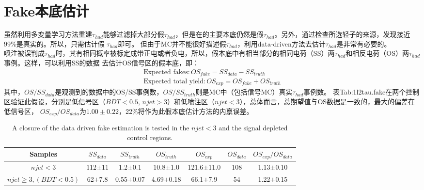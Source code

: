 \section{Fake本底估计}
虽然利用多变量学习方法重建$\tau_{had}$能够过滤掉大部分假$\tau_{had}$，但是在\ltwotau 的主要本底仍然是假$\tau_{had}$。另外，通过检查所选轻子的来源，发现接近99\%是真实的。所以，只需估计假
$\tau_{had}$即可。
但由于MC并不能很好描述假$\tau_{had}$，利用data-driven方法去估计$\tau_{had}$是非常有必要的。\\
喷注被误判成$\tau_{had}$时，其有相同概率被标定成带正电或者负电，所以，假本底中有相当部分的相同电荷（SS）两$\tau_{had}$和相反电荷（OS）两$\tau_{had}$事例。这样，可以利用SS的数据
去估计OS信号区的假本底，即：
\begin{equation}
\begin{aligned}
\text{Expected fakes}: OS_{fake}=SS_{data}-SS_{truth} \\
\text{Expected total yield}: OS_{exp}=OS_{fake}+OS_{truth}
\end{aligned}
\end{equation}
其中，$OS/SS_{data}$是观测到的数据中的OS/SS事例数，$OS/SS_{truth}$则是MC中（包括信号MC）真实$\tau_{had}$事例数。
表{Tab:1l2tau.fake}在两个控制区验证此假设，分别是低信号区（$BDT<0.5$, $njet>3$）和低喷注区（$njet<3$），总体而言，总期望值与OS数据是一致的，最大的偏差在低信号区，
$OS_{exp}/OS_{data}$为$1.00\pm 0.22$，22\%将作为此假本底估计方法的内禀误差。

\begin{table}[htbp]
\small
\begin{center}
\begin{tabular}{|c|c|c|c|c|c|c|}\hline
Samples & $SS_{data}$  & $SS_{truth}$ & $OS_{truth}$ & $OS_{exp}$ & $OS_{data}$ & $OS_{exp}/OS_{data}$ \\ \hline
$njet<3$ & 112$\pm$11 & 1.2$\pm$0.1 & 10.8$\pm$1.0 & 121.6$\pm$11.0 & 108 &  1.13$\pm$0.10 \\
$njet\ge3,(BDT<0.5)$ & 62$\pm$7.8 & 0.55$\pm$0.07 & 4.69$\pm$0.18 & 66.1$\pm$7.9 & 54 & 1.22$\pm$0.15 \\ \hline 

\end{tabular}
\caption{ A closure of the  data driven fake estimation is tested in the $njet<3$ and the signal depleted control regions.
}
\label{Tab:1l2tau.fake}
\end{center}
\end{table}

